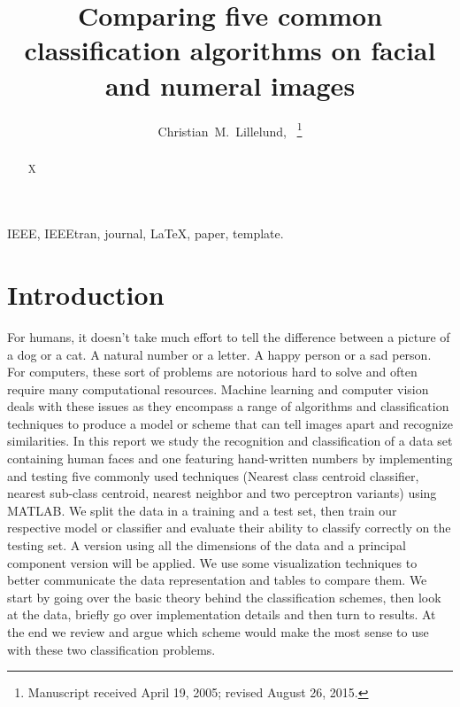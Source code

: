\documentclass[journal]{IEEEtran}
\begin{document}
	
\title{Comparing five common classification algorithms on facial and numeral images}


\author{Christian~M.~Lillelund,~%
\thanks{Manuscript received April 19, 2005; revised August 26, 2015.}}
\maketitle



\begin{abstract}
X
\end{abstract}

\begin{IEEEkeywords}
	IEEE, IEEEtran, journal, \LaTeX, paper, template.
\end{IEEEkeywords}

\section{Introduction}
For humans, it doesn't take much effort to tell the difference between a picture of a dog or a cat. A natural number or a letter. A happy person or a sad person. For computers, these sort of problems are notorious hard to solve and often require many computational resources. Machine learning and computer vision deals with these issues as they encompass a range of algorithms and classification techniques to produce a model or scheme that can tell images apart and recognize similarities. In this report we study the recognition and classification of a data set containing human faces and one featuring hand-written numbers by implementing and testing five commonly used techniques (Nearest class centroid classifier, nearest sub-class centroid, nearest neighbor and two perceptron variants) using MATLAB. We split the data in a training and a test set, then train our respective model or classifier and evaluate their ability to classify correctly on the testing set. A version using all the dimensions of the data and a principal component version will be applied. We use some visualization techniques to better communicate the data representation and tables to compare them. We start by going over the basic theory behind the classification schemes, then look at the data, briefly go over implementation details and then turn to results. At the end we review and argue which scheme would make the most sense to use with these two classification problems.
\end{document}
